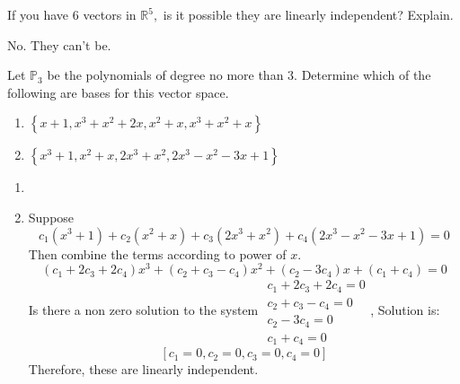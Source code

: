 \begin{enumialphparenastyle}
\begin{ex} If you have $6$ vectors in $\mathbb{R}^{5},$ is it possible they are
linearly independent? Explain. 
\begin{sol}
No. They can't be.
\end{sol}
\end{ex}

\begin{ex} Let $\mathbb{P}_3$ be the polynomials of degree no more than 3. Determine which
of the following are bases for this vector space.

\begin{enumerate}
\item $\left\{ x+1,x^{3}+x^{2}+2x,x^{2}+x,x^{3}+x^{2}+x\right\} $

\item $\left\{ x^{3}+1,x^{2}+x,2x^{3}+x^{2},2x^{3}-x^{2}-3x+1\right\} $
\end{enumerate}

\begin{sol}
\begin{enumerate}
\item 
\item
Suppose
\[
c_{1}\left( x^{3}+1\right) +c_{2}\left( x^{2}+x\right) +c_{3}\left(
2x^{3}+x^{2}\right) +c_{4}\left( 2x^{3}-x^{2}-3x+1\right) =0
\]
Then combine the terms according to power of $x.$
\[
\left( c_{1}+2c_{3}+2c_{4}\right) x^{3}+\left( c_{2}+c_{3}-c_{4}\right)
x^{2}+\left( c_{2}-3c_{4}\right) x+\left( c_{1}+c_{4}\right) =0
\]
Is there a non zero solution to the system $
\begin{array}{c}
c_{1}+2c_{3}+2c_{4}=0 \\
c_{2}+c_{3}-c_{4}=0 \\
c_{2}-3c_{4}=0 \\
c_{1}+c_{4}=0
\end{array}
$, Solution is:
\[
\left[ c_{1}=0,c_{2}=0,c_{3}=0,c_{4}=0\right]
\]
Therefore, these are linearly independent.
\end{enumerate}
\end{sol}
\end{ex}


\end{enumialphparenastyle}
